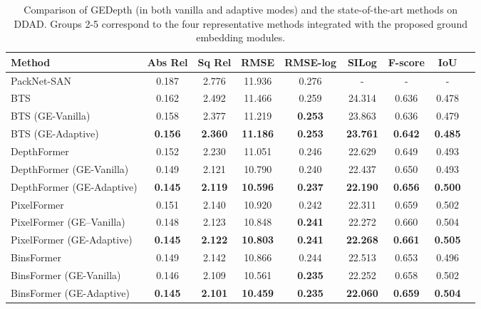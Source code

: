 \documentclass[10pt,twocolumn,letterpaper]{article}
\begin{document}
\begin{table*}
\small
\begin{center}
\begin{tabular}{lcccccccc}
\hline
Method &Abs Rel  &  Sq Rel  & RMSE  & RMSE-log  & SILog  &  F-score  &IoU  \\
\hline
PackNet-SAN~\cite{guizilini2021sparse} & 0.187 & 2.776 & 11.936 & 0.276 & - & - & -\\
\hline
BTS~\cite{lee2019big} & 0.162 & 2.492 & 11.466 & 0.259 & 24.314 & 0.636 & 0.478\\
BTS (GE-Vanilla) & 0.158 & 2.377 & 11.219 & \textbf{0.253} & 23.863 & 0.636 & 0.479\\

BTS (GE-Adaptive) & \textbf{0.156} & \textbf{2.360} & \textbf{11.186} & \textbf{0.253} & \textbf{23.761} & \textbf{0.642} & \textbf{0.485}\\
\hline
DepthFormer~\cite{li2022depthformer} & 0.152 & 2.230 & 11.051 & 0.246 &22.629 & 0.649 & 0.493\\
DepthFormer (GE-Vanilla) & 0.149 & 2.121 & 10.790 & 0.240 & 22.437 & 0.650 & 0.493\\
DepthFormer (GE-Adaptive) & \textbf{0.145} & \textbf{2.119} & \textbf{10.596} & \textbf{0.237} & \textbf{22.190} & \textbf{0.656} & \textbf{0.500}\\
\hline
PixelFormer~\cite{agarwal2023attention} & 0.151 & 2.140 & 10.920 & 0.242 & 22.311 & 0.659 & 0.502\\
PixelFormer (GE–Vanilla) & 0.148 & 2.123 & 10.848 & \textbf{0.241} & 22.272 & 0.660 & 0.504\\
PixelFormer (GE-Adaptive) & \textbf{0.145} & \textbf{2.122} & \textbf{10.803} & \textbf{0.241} & \textbf{22.268} & \textbf{0.661} & \textbf{0.505}\\
\hline
BinsFormer~\cite{li2022binsformer} & 0.149 & 2.142 & 10.866 & 0.244 & 22.513 & 0.653 & 0.496\\
BinsFormer (GE-Vanilla) & 0.146 & 2.109 & 10.561 & \textbf{0.235} & 22.252 & 0.658 & 0.502\\
BinsFormer (GE-Adaptive) & \textbf{0.145} & \textbf{2.101} & \textbf{10.459} & \textbf{0.235} & \textbf{22.060} & \textbf{0.659} & \textbf{0.504}\\
\hline
\end{tabular}
\end{center}
\caption{Comparison of GEDepth (in both vanilla and adaptive modes) and the state-of-the-art methods on DDAD. Groups 2-5 correspond to the four representative methods integrated with the proposed ground embedding modules.}
\label{tab:ddad_results}
\end{table*}
\end{document}
